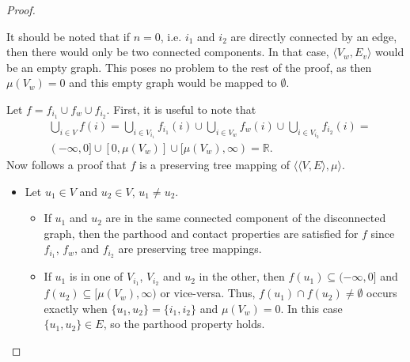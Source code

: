 \documentclass{article}
\newcommand{\R}{\mathbb{R}}
\begin{document}
\begin{proof}
\begin{figure}[ht]
    \end{figure}

    It should be noted that if $n = 0$, i.e. $i_1$ and $i_2$ are directly connected by an edge, then there would only be two connected components. In that case, $\langle V_w, E_v \rangle$ would be an empty graph. This poses no problem to the rest of the proof, as then $\mu(V_w) = 0$ and this empty graph would be mapped to $\emptyset$.

    Let $f = f_{i_1} \cup f_w \cup f_{i_2}$. First, it is useful to note that
    \begin{align*}
      & \bigcup_{i \in V}f(i) = \bigcup_{i \in V_{i_1}}f_{i_1}(i) \cup \bigcup_{i \in V_w}f_w(i) \cup \bigcup_{i \in V_{i_2}}f_{i_2}(i) = \\
      & (-\infty, 0] \cup [0, \mu(V_w)] \cup [\mu(V_w), \infty) = \R.
    \end{align*}
    Now follows a proof that $f$ is a preserving tree mapping of $\langle \langle V, E \rangle, \mu \rangle$.
    \begin{itemize}
    \item Let $u_1 \in V$ and $u_2 \in V$, $u_1 \neq u_2$.
      \begin{itemize}
      \item If $u_1$ and $u_2$ are in the same connected component of the disconnected graph, then the parthood and contact properties are satisfied for $f$ since $f_{i_1}$, $f_w$, and $f_{i_2}$ are preserving tree mappings.
      \item If $u_1$ is in one of $V_{i_1}$, $V_{i_2}$ and $u_2$ in the other, then $f(u_1) \subseteq (-\infty, 0]$ and $f(u_2) \subseteq [\mu(V_w), \infty)$ or vice-versa.
    Thus, $f(u_1) \cap f(u_2) \neq \emptyset$ occurs exactly when $\{u_1, u_2\} = \{i_1, i_2\}$ and $\mu(V_w) = 0$. In this case $\{u_1, u_2\} \in E$, so the parthood property holds.


\end{itemize}
\end{itemize}
\end{proof}
\end{document}
